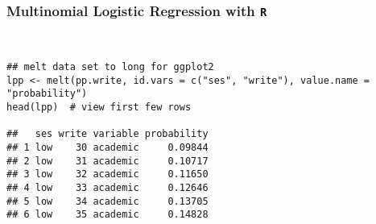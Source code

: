 \documentclass[00-GLMregslides.tex]{subfiles}
\begin{document}
	
\begin{frame}[fragile]
\frametitle{Multinomial Logistic Regression with \texttt{R} }
\begin{framed}
\begin{verbatim}


## melt data set to long for ggplot2
lpp <- melt(pp.write, id.vars = c("ses", "write"), value.name = "probability")
head(lpp)  # view first few rows
 
##   ses write variable probability
## 1 low    30 academic     0.09844
## 2 low    31 academic     0.10717
## 3 low    32 academic     0.11650
## 4 low    33 academic     0.12646
## 5 low    34 academic     0.13705
## 6 low    35 academic     0.14828
 



\end{verbatim}
\end{framed}
\end{frame}
\end{document}
